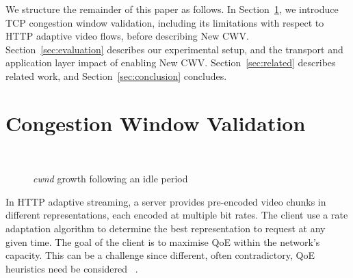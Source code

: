 \documentclass[10pt, acmlarge]{acmart}
\begin{document}
We structure the remainder of this paper as follows. In Section~\ref{sec:background},
 we introduce TCP congestion window validation, including its limitations with respect 
 to HTTP adaptive video flows, before describing New CWV. Section~\ref{sec:evaluation}
  describes our experimental setup, and the transport and application layer impact of 
  enabling New CWV. Section~\ref{sec:related} describes related work, and 
  Section~\ref{sec:conclusion} concludes.

\section{Congestion Window Validation}
\label{sec:background}

\begin{figure}
  \centering
    ~
    \caption{\emph{cwnd} growth following an idle period}
    \label{fig:cwnd-growth-after-idle}
\end{figure}

In HTTP adaptive streaming, a server provides pre-encoded video chunks in different 
representations, each encoded at multiple bit rates. The client use a rate adaptation 
algorithm to determine the best representation to request at any given time. 
The goal of the client is to maximise QoE within the network's capacity. This can be a 
challenge since different, often contradictory, QoE heuristics need be considered
~\cite{Seufert-2015-A-Survey-on-QoE-Dash}. 
\end{document}
